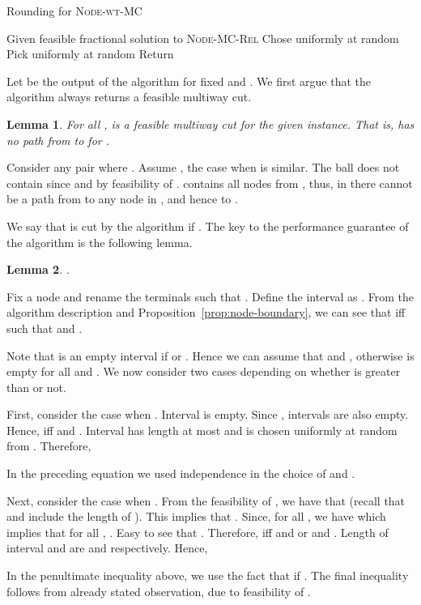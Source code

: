 \documentclass[11pt]{article}
\newtheorem{lemma}{Lemma}[section]
\renewenvironment{proof}{\vspace{-0.1in}\noindent{\bf Proof:}}{\hspace*{\fill}\par}
\def\NodeMC{\textsc{Node-wt-MC}\xspace}
\def\NodeMC{\textsc{Node-wt-MC}\xspace}
\def\NodeMCRel{\textsc{Node-MC-Rel}\xspace}
\begin{document}
\begin{algorithm}[htb]
	\caption{Rounding for \NodeMC}
	\label{alg:node_cut_rounding_scheme}
	\begin{algorithmic}[1]
		\STATE Given feasible fractional solution  to \NodeMCRel
		\STATE Chose  uniformly at random
\STATE Pick  uniformly at random
\STATE 
		\STATE Return 
	\end{algorithmic}
\end{algorithm}

Let  be the output of the algorithm for fixed 
and .  We first argue that the algorithm always returns a
feasible multiway cut.
\begin{lemma}
For all ,  
is a feasible multiway cut for the given instance. That is, 
has no path from  to  for .
\end{lemma}
\begin{proof}
  Consider any pair  where .
  Assume , the case when  is similar.
  The ball  does not contain  since 
   and  by feasibility of .
   contains all nodes from , thus, in   there
  cannot be a path from  to any node in ,
  and hence to .
\end{proof}

We say that  is cut by the algorithm if .  The key to the
performance guarantee of the algorithm is the following lemma.
\begin{lemma}
  \label{lem:node-cut-prob}
  .
\end{lemma}
\begin{proof}
  Fix a node  and rename the terminals such that . Define the interval  as
  . From the algorithm
  description and Proposition~\ref{prop:node-boundary}, we can see
  that  iff  such that  and .

  Note that  is an empty interval if  or . Hence we can assume that  and , otherwise  is empty for all  and . We now consider two cases depending on
  whether  is greater than  or not.

  First, consider the case when . Interval
   is empty. Since , intervals  are also empty. Hence,  iff  and . Interval  has length at
  most  and  is chosen uniformly at random from
  . Therefore,


In the preceding equation we used independence in the choice of  and 
.

Next, consider the case when . From the
feasibility of , we have that 
(recall that  and  include the length of
). This implies that . Since,  for all , we have  which implies that
for all , . Easy to see that . Therefore,  iff 
and  or  and . Length of
interval  and  are  and  respectively. Hence,

In the penultimate inequality above, we use the fact that  if . The final inequality follows from already stated
observation,  due to feasibility of
.
\end{proof}
\end{document}
